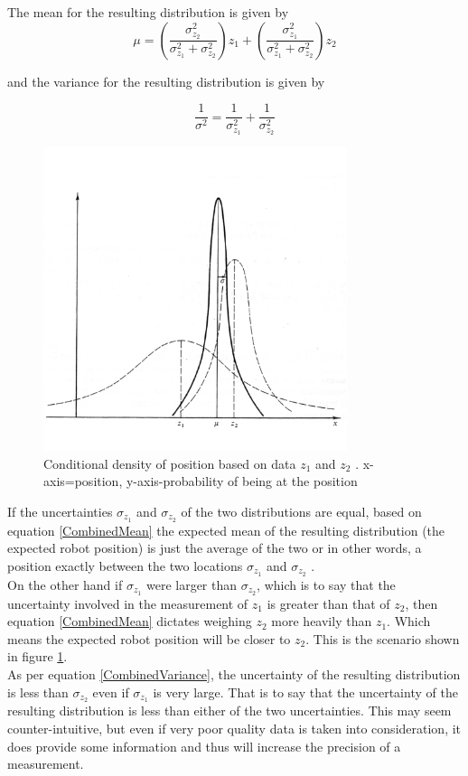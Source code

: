 \documentclass[conference]{IEEEtran}
\begin{document}
The mean for the resulting distribution is given by \cite{maybeck}
\begin{equation}\label{CombinedMean}
\mu = (\frac{\sigma_{z_2}^2}{\sigma_{z_1}^2 + \sigma_{z_2}^2})z_1 + (\frac{\sigma_{z_1}^2}{\sigma_{z_1}^2 + \sigma_{z_2}^2})z_2
\end{equation}

and the variance for the resulting distribution is given by

\begin{equation}\label{CombinedVariance}
\frac{1}{\sigma^2}=\frac{1}{\sigma_{z_1}^2}+\frac{1}{\sigma_{z_2}^2}
\end{equation}

\begin{figure}
\centering
\includegraphics[width=3.5in, height=3.5in]{./figures/CombineGaussians.png}
\caption{Conditional density of position based on data $z_1$ and $z_2$ \cite{maybeck}. x-axis=position, y-axis-probability of being at the position}
\label{CombineGaussians}
\end{figure}

If the uncertainties $\sigma_{z_1}$ and $\sigma_{z_2}$ of the two distributions are equal, based on equation \ref{CombinedMean} the expected mean of the resulting distribution (the expected robot position) is just the average of the two or in other words, a position exactly between the two locations $\sigma_{z_1}$ and $\sigma_{z_2}$ \cite{maybeck}.\\

On the other hand if $\sigma_{z_1}$ were larger than $\sigma_{z_2}$, which is to say that the uncertainty involved in the measurement of $z_1$ is greater than that of $z_2$, then equation \ref{CombinedMean} dictates weighing $z_2$ more heavily than $z_1$. Which means the expected robot position will be closer to $z_2$. This is the scenario shown in figure \ref{CombineGaussians}.\\

As per equation \ref{CombinedVariance}, the uncertainty of the resulting distribution is less than $\sigma_{z_2}$ even if $\sigma_{z_1}$ is very large. That is to say that the uncertainty of the resulting distribution is less than either of the two uncertainties. This may seem counter-intuitive, but even if very poor quality data is taken into consideration, it does provide some information and thus will increase the precision of a measurement.

\end{document}
